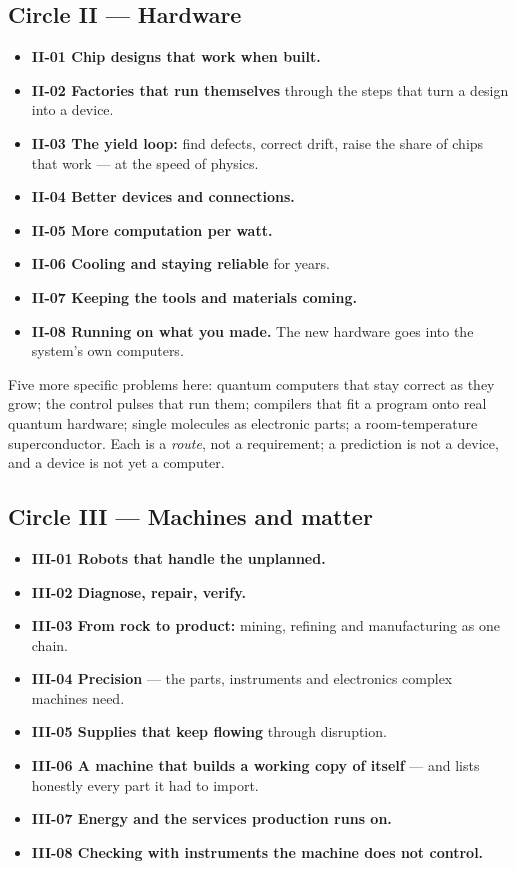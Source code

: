 \documentclass[11pt]{article}
\begin{document}
\subsection*{Circle II --- Hardware}

\begin{itemize}[leftmargin=1.4em,itemsep=2pt]
\item \textbf{II-01 Chip designs that work when built.}
\item \textbf{II-02 Factories that run themselves} through the steps that turn a design into a device.
\item \textbf{II-03 The yield loop:} find defects, correct drift, raise the share of chips that work --- at the speed of physics.
\item \textbf{II-04 Better devices and connections.}
\item \textbf{II-05 More computation per watt.}
\item \textbf{II-06 Cooling and staying reliable} for years.
\item \textbf{II-07 Keeping the tools and materials coming.}
\item \textbf{II-08 Running on what you made.} The new hardware goes into the system's own computers.
\end{itemize}

Five more specific problems here: quantum computers that stay correct as they grow; the control pulses that run them; compilers that fit a program onto real quantum hardware; single molecules as electronic parts; a room-temperature superconductor. Each is a \emph{route}, not a requirement; a prediction is not a device, and a device is not yet a computer.

\subsection*{Circle III --- Machines and matter}

\begin{itemize}[leftmargin=1.4em,itemsep=2pt]
\item \textbf{III-01 Robots that handle the unplanned.}
\item \textbf{III-02 Diagnose, repair, verify.}
\item \textbf{III-03 From rock to product:} mining, refining and manufacturing as one chain.
\item \textbf{III-04 Precision} --- the parts, instruments and electronics complex machines need.
\item \textbf{III-05 Supplies that keep flowing} through disruption.
\item \textbf{III-06 A machine that builds a working copy of itself} --- and lists honestly every part it had to import.
\item \textbf{III-07 Energy and the services production runs on.}
\item \textbf{III-08 Checking with instruments the machine does not control.}
\end{itemize}
\end{document}
